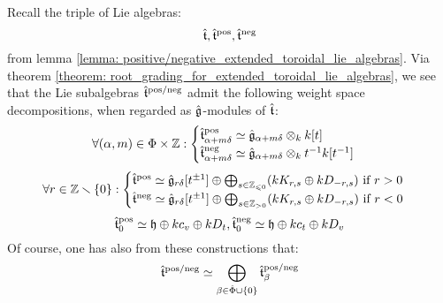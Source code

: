         \begin{corollary}
            Recall the triple of Lie algebras:
                $$\hat{\mathfrak{t}}, \hat{\mathfrak{t}}^{\mathrm{pos}}, \hat{\mathfrak{t}}^{\mathrm{neg}}$$
            from lemma \ref{lemma: positive/negative_extended_toroidal_lie_algebras}. Via theorem \ref{theorem: root_grading_for_extended_toroidal_lie_algebras}, we see that the Lie subalgebras $\hat{\mathfrak{t}}^{\mathrm{pos}/\mathrm{neg}}$ admit the following weight space decompositions, when regarded as $\hat{\mathfrak{g}}$-modules of $\hat{\mathfrak{t}}$:
                $$
                    \forall (\alpha, m) \in \Phi \x \Z:
                    \begin{cases}
                        \extendedtoroidal^{\positive}_{\alpha + m\delta} \cong \hat{\g}_{\alpha + m\delta} \tensor_{k} k[t]
                        \\
                        \extendedtoroidal^{\negative}_{\alpha + m\delta} \cong \hat{\g}_{\alpha + m\delta} \tensor_{k} t^{-1}k[t^{-1}]
                    \end{cases}
                $$
                $$
                    \forall r \in \mathbb{Z} \smallsetminus \{0\}:
                    \begin{cases}
                        \text{$\hat{\mathfrak{t}}^{\mathrm{pos}} \simeq \hat{\mathfrak{g}}_{r\delta}[t^{\pm 1}] \oplus \bigoplus_{s \in \mathbb{Z}_{\leqslant 0}} (k K_{r, s} \oplus k D_{-r, s})$ if $r > 0$}
                        \\
                        \text{$\hat{\mathfrak{t}}^{\mathrm{neg}} \simeq \hat{\mathfrak{g}}_{r\delta}[t^{\pm 1}] \oplus \bigoplus_{s \in \mathbb{Z}_{> 0}} (k K_{r, s} \oplus k D_{-r, s})$ if $r < 0$}
                    \end{cases}
                $$
                $$\hat{\mathfrak{t}}^{\mathrm{pos}}_0 \simeq \mathfrak{h} \oplus k c_v \oplus k D_t, \hat{\mathfrak{t}}^{\mathrm{neg}}_0 \simeq \mathfrak{h} \oplus k c_t \oplus k D_v$$
            Of course, one has also from these constructions that:
                $$\hat{\mathfrak{t}}^{\mathrm{pos}/\mathrm{neg}} \simeq \bigoplus_{\beta \in \hat{\Phi} \cup \{0\}} \hat{\mathfrak{t}}^{\mathrm{pos}/\mathrm{neg}}_{\beta}$$
        \end{corollary}
        
